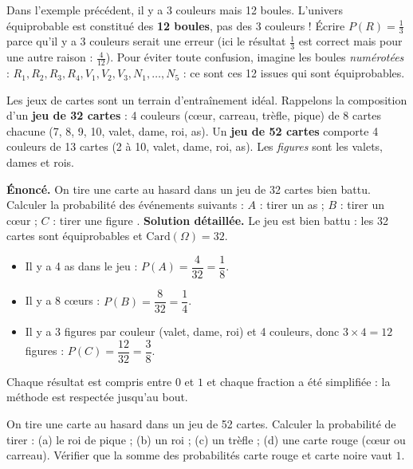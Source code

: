 \documentclass[11pt]{article}
\newcounter{popsec}
\newcounter{popsub}
\newcommand{\courssub}[1]{%
  \stepcounter{popsub}%
  \par\vspace{9pt}\noindent{\popxbold\fontsize{11.5}{13}\selectfont\color{popink}{\color{poporange}\thepopsec.\thepopsub}\hspace{6pt}#1}\par\nopagebreak\vspace{4pt}
}
\begin{document}
\begin{attention}
Dans l'exemple précédent, il y a 3 couleurs mais 12 boules. L'univers équiprobable est constitué des \textbf{12 boules}, pas des 3 couleurs ! Écrire $P(R) = \frac{1}{3}$ parce qu'il y a 3 couleurs serait une erreur (ici le résultat $\frac{1}{3}$ est correct mais pour une autre raison : $\frac{4}{12}$). Pour éviter toute confusion, imagine les boules \emph{numérotées} : $R_1, R_2, R_3, R_4, V_1, V_2, V_3, N_1, \dots, N_5$ : ce sont ces 12 issues qui sont équiprobables.
\end{attention}

\courssub{Application aux jeux de cartes}

Les jeux de cartes sont un terrain d'entraînement idéal. Rappelons la composition d'un \textbf{jeu de 32 cartes} : 4 couleurs (cœur, carreau, trèfle, pique) de 8 cartes chacune (7, 8, 9, 10, valet, dame, roi, as). Un \textbf{jeu de 52 cartes} comporte 4 couleurs de 13 cartes (2 à 10, valet, dame, roi, as). Les \emph{figures} sont les valets, dames et rois.

\begin{exoresolu}
\textbf{Énoncé.} On tire une carte au hasard dans un jeu de 32 cartes bien battu. Calculer la probabilité des événements suivants :
$A$ : \og tirer un as \fg{} ; $B$ : \og tirer un cœur \fg{} ; $C$ : \og tirer une figure \fg.
\tcblower
\textbf{Solution détaillée.} Le jeu est bien battu : les 32 cartes sont équiprobables et $\mathrm{Card}(\Omega) = 32$.
\begin{itemize}
\item Il y a 4 as dans le jeu : $P(A) = \dfrac{4}{32} = \dfrac{1}{8}$.
\item Il y a 8 cœurs : $P(B) = \dfrac{8}{32} = \dfrac{1}{4}$.
\item Il y a 3 figures par couleur (valet, dame, roi) et 4 couleurs, donc $3 \times 4 = 12$ figures : $P(C) = \dfrac{12}{32} = \dfrac{3}{8}$.
\end{itemize}
Chaque résultat est compris entre $0$ et $1$ et chaque fraction a été simplifiée : la méthode est respectée jusqu'au bout.
\end{exoresolu}

\begin{exercice}
On tire une carte au hasard dans un jeu de 52 cartes. Calculer la probabilité de tirer : (a) le roi de pique ; (b) un roi ; (c) un trèfle ; (d) une carte rouge (cœur ou carreau). Vérifier que la somme des probabilités \og carte rouge \fg{} et \og carte noire \fg{} vaut $1$.
\end{exercice}
\end{document}
